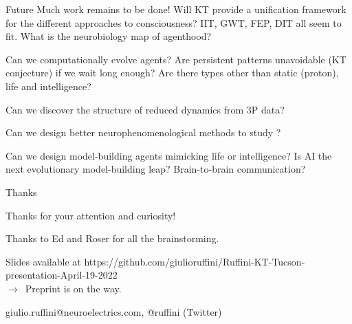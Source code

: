 \begin{frame}[label=ladila]{Future}
Much work remains to be done! Will KT provide a unification framework for the different approaches to consciousness? IIT, GWT, FEP, DIT all seem to fit. What is the neurobiology map of agenthood?\vfill

Can we computationally evolve agents? Are persistent patterns unavoidable (KT conjecture) if we wait long enough? Are there  types other than static (proton), life and intelligence? \vfill


Can we discover the structure of reduced dynamics from 3P data? \vfill

Can we design better neurophenomenological methods to study \SEP?   \vfill

Can we design model-building agents mimicking life or intelligence? Is AI the next evolutionary model-building leap? Brain-to-brain communication?\vfill


\end{frame}


\begin{frame}[label=ladila]{Thanks}
\vfill
\begin{center}

   {\Large Thanks for your attention and curiosity!}  \vfill
   
   {\large Thanks to  Ed and Roser for all the brainstorming.}  \vfill
    

    
    Slides available at {\small  https://github.com/giulioruffini/Ruffini-KT-Tucson-presentation-April-19-2022 }\\ $\rightarrow$~Preprint is on the way.\vspace{1.5cm} 
    
        giulio.ruffini@neuroelectrics.com, @ruffini (Twitter)  \vfill
        
\end{center}
\vfill

\end{frame}